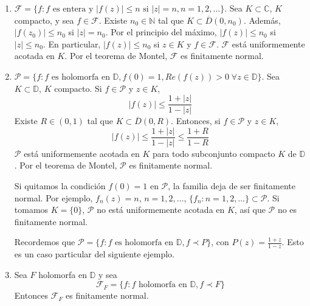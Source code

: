 \begin{example}
    \hfill
    \begin{enumerate}
        \item $\mathcal{F} = \{f : f \text{ es entera y } |f(z)| \leq n \text{ si } |z| = n, n = 1, 2, \dots\}$.
              Sea $K \subset \mathbb{C}$, $K$ compacto, y sea $f \in \mathcal{F}$.
              Existe $n_0 \in \mathbb{N}$ tal que $K \subset \overline{D}(0, n_0)$.
              Además, $|f(z_0)| \leq n_0$ si $|z| = n_0$.
              Por el principio del máximo, $|f(z)| \leq n_0$ si $|z| \leq n_0$.
              En particular, $|f(z)| \leq n_0$ si $z \in K$ y $f \in \mathcal{F}$.
              $\mathcal{F}$ está uniformemente acotada en $K$.
              Por el teorema de Montel, $\mathcal{F}$ es finitamente normal.

        \item $\mathcal{P} = \{f : f \text{ es holomorfa en } \mathbb{D}, f(0) = 1, Re(f(z)) > 0 \; \forall z \in \mathbb{D}\}$.
              Sea $K \subset \mathbb{D}$, $K$ compacto.
              Si $f \in \mathcal{P}$ y $z \in K$,
              $$|f(z)| \leq \frac{1+|z|}{1-|z|}$$
              Existe $R \in (0, 1)$ tal que $K \subset \overline{D}(0, R)$.
              Entonces, si $f \in \mathcal{P}$ y $z \in K$,
              $$|f(z)| \leq \frac{1+|z|}{1-|z|} \leq \frac{1+R}{1-R}$$
              $\mathcal{P}$ está uniformemente acotada en $K$ para todo subconjunto compacto $K$ de $\mathbb{D}$.
              Por el teorema de Montel, $\mathcal{P}$ es finitamente normal.

              \begin{remark}
                  Si quitamos la condición $f(0) = 1$ en $\mathcal{P}$, la familia deja de ser finitamente normal.
                  Por ejemplo, $f_n(z) = n$, $n = 1, 2, \dots$, $\{f_n : n = 1, 2, \dots\} \subset \mathcal{P}$.
                  Si tomamos $K = \{0\}$, $\mathcal{P}$ no está uniformemente acotada en $K$, así que $\mathcal{P}$ no es finitamente normal.
              \end{remark}

              Recordemos que $\mathcal{P} = \{f : f \text{ es holomorfa en } \mathbb{D}, f \prec P\}$, con $P(z) = \frac{1+z}{1-z}$.
              Esto es un caso particular del siguiente ejemplo.

        \item Sea $F$ holomorfa en $\mathbb{D}$ y sea
              $$\mathcal{F}_F = \{f : f \text{ holomorfa en } \mathbb{D}, f \prec F\}$$
              Entonces $\mathcal{F}_F$ es finitamente normal.


\end{enumerate}
\end{example}
